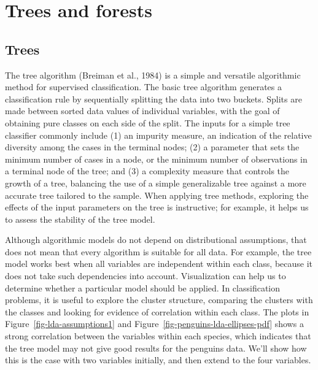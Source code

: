 \documentclass[
  letterpaper,
]{krantz}
\begin{document}

\chapter{Trees and forests}\label{sec-trees-forests}

\section{Trees}\label{sec-trees}


The tree algorithm (Breiman et al., 1984) is a simple and versatile
algorithmic method for supervised classification. The basic tree
algorithm generates a classification rule by sequentially splitting the
data into two buckets. Splits are made between sorted data values of
individual variables, with the goal of obtaining pure classes on each
side of the split. The inputs for a simple tree classifier commonly
include (1) an impurity measure, an indication of the relative diversity
among the cases in the terminal nodes; (2) a parameter that sets the
minimum number of cases in a node, or the minimum number of observations
in a terminal node of the tree; and (3) a complexity measure that
controls the growth of a tree, balancing the use of a simple
generalizable tree against a more accurate tree tailored to the sample.
When applying tree methods, exploring the effects of the input
parameters on the tree is instructive; for example, it helps us to
assess the stability of the tree model.

Although algorithmic models do not depend on distributional assumptions,
that does not mean that every algorithm is suitable for all data. For
example, the tree model works best when all variables are independent
within each class, because it does not take such dependencies into
account. Visualization can help us to determine whether a particular
model should be applied. In classification problems, it is useful to
explore the cluster structure, comparing the clusters with the classes
and looking for evidence of correlation within each class. The plots in
Figure~\ref{fig-lda-assumptions1} and
Figure~\ref{fig-penguins-lda-ellipses-pdf} shows a strong correlation
between the variables within each species, which indicates that the tree
model may not give good results for the penguins data. We'll show how
this is the case with two variables initially, and then extend to the
four variables.
\end{document}
